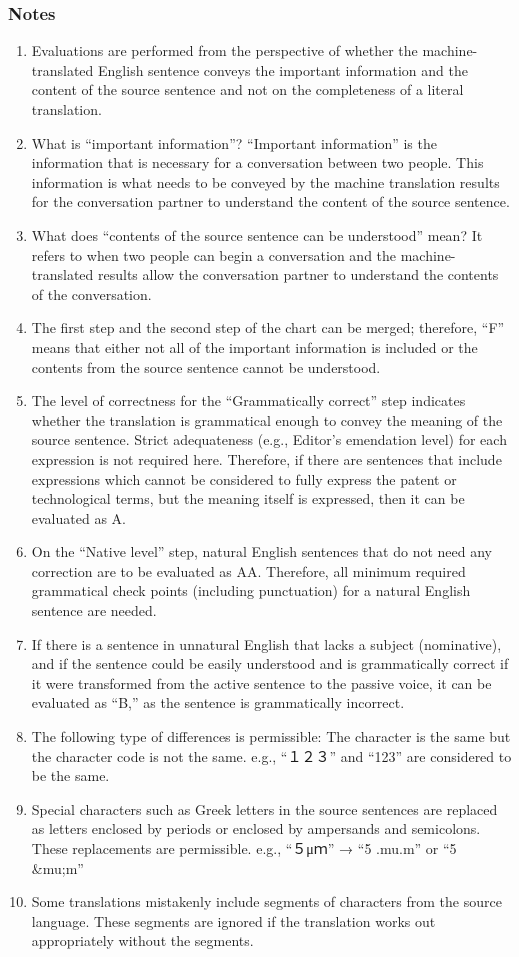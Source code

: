 \documentclass[english]{jnlp_1.4}
\begin{document}
\subsubsection{Notes}
\begin{enumerate}
\item Evaluations are performed from the perspective of whether the machine-translated English sentence conveys the important information and the content of the source sentence and not on the completeness of a literal translation.
\item What is ``important information''?
``Important information'' is the information that is necessary for a conversation between two people. This information is what needs to be conveyed by the machine translation results for the conversation partner to understand the content of the source sentence.
\item What does ``contents of the source sentence can be understood'' mean?
It refers to when two people can begin a conversation and the machine-translated results allow the conversation partner to understand the contents of the conversation.
\item The first step and the second step of the chart can be merged; therefore, ``F'' means that either not all of the important information is included or the contents from the source sentence cannot be understood.
\item The level of correctness for the ``Grammatically correct'' step indicates whether the translation is grammatical enough to convey the meaning of the source sentence. Strict adequateness (e.g., Editor's emendation level) for each expression is not required here. Therefore, if there are sentences that include expressions which cannot be considered to fully express the patent or technological terms, but the meaning itself is expressed, then it can be evaluated as A.
\item On the ``Native level'' step, natural English sentences that do not need any correction are to be evaluated as AA. Therefore, all minimum required grammatical check points (including punctuation) for a natural English sentence are needed. 
\item If there is a sentence in unnatural English that lacks a subject (nominative), and if the sentence could be easily understood and is grammatically correct if it were transformed from the active sentence to the passive voice, it can be evaluated as ``B,'' as the sentence is grammatically incorrect. 
\item The following type of differences is permissible:
The character is the same but the character code is not the same.
e.g., ``１２３'' and ``123'' are considered to be the same.
\item Special characters such as Greek letters in the source sentences are replaced as letters enclosed by periods or enclosed by ampersands and semicolons. These replacements are permissible. 
e.g., ``５μｍ'' → ``5 .mu.m'' or ``5 \&mu;m''
\item Some translations mistakenly include segments of characters from the source language. These segments are ignored if the translation works out appropriately without the segments. 
\end{enumerate}
\end{document}
